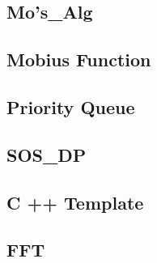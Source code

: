 \documentclass[12pt]{extarticle}
\begin{document}
\begin{multicols*}{2}
\subsection{Mo's_Alg} %


\subsection{Mobius Function} %


\subsection{Priority Queue} %


% 

% 



% 

\subsection{SOS_DP} %


\subsection{C ++ Template} %


\subsection{FFT} %



\end{multicols*}
\end{document}
